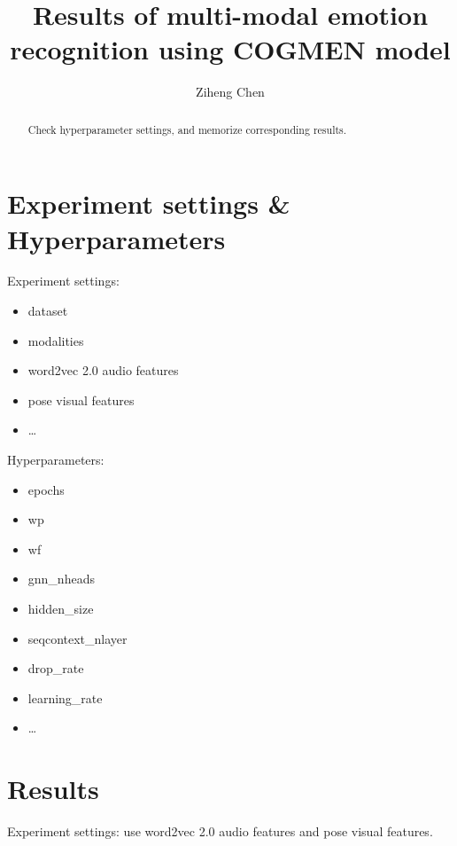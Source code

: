 \documentclass[a4paper]{article}
\title{Results of multi-modal emotion recognition using COGMEN model}
\author{Ziheng Chen}
\begin{document}
    \maketitle

\begin{abstract}
    \large
    Check hyperparameter settings, and memorize corresponding results.
\end{abstract}

\tableofcontents

\section{Experiment settings \& Hyperparameters}
Experiment settings:

\begin{itemize}
    \item dataset
    \item modalities
    \item word2vec 2.0 audio features
    \item pose visual features
    \item \ldots
\end{itemize}

\noindent 
Hyperparameters:

\begin{itemize}
    \item epochs
    \item wp
    \item wf
    \item gnn\_nheads
    \item hidden\_size
    \item seqcontext\_nlayer
    \item drop\_rate
    \item learning\_rate
    \item \ldots
\end{itemize}

\section{Results}
Experiment settings: use word2vec 2.0 audio features and pose visual features.
\end{document}
